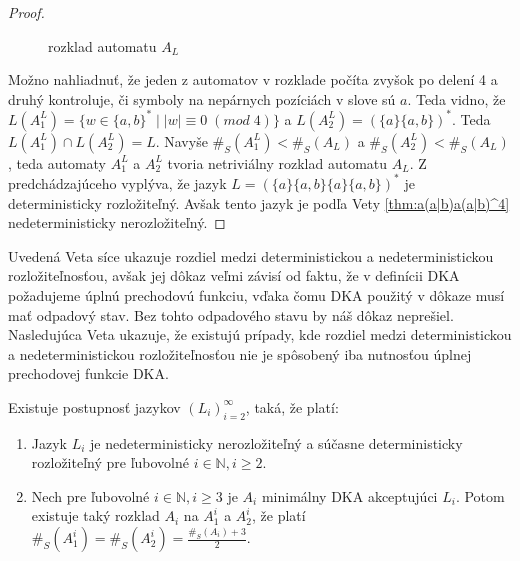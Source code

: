 \begin{proof}
\begin{figure}[H]
\caption{rozklad automatu $ A_L $}
\end{figure}

Možno nahliadnuť, že jeden z automatov v rozklade počíta zvyšok po delení 4 a druhý kontroluje, či symboly na nepárnych pozíciách v slove sú $ a $. Teda vidno, že $ L(A_1^L) = \lbrace w \in \lbrace a,b \rbrace^* \; | \; |w| \equiv 0 \; (mod \; 4) \rbrace $ a $ L(A_2^L) = (\lbrace a \rbrace \lbrace a,b \rbrace)^* $. Teda $ L(A_1^L) \cap L(A_2^L) = L $. Navyše $ \#_S(A_1^L) < \#_S(A_L) $ a $ \#_S(A_2^L) < \#_S(A_L) $, teda automaty $ A_1^L $ a $ A_2^L $ tvoria netriviálny rozklad automatu $ A_L $. Z predchádzajúceho vyplýva, že jazyk $ L = (\lbrace a \rbrace \lbrace a,b \rbrace \lbrace a \rbrace \lbrace a,b \rbrace)^* $ je deterministicky rozložiteľný. Avšak tento jazyk je podľa Vety \ref{thm:a(a|b)a(a|b)^4} nedeterministicky nerozložiteľný.
\end{proof}

Uvedená Veta síce ukazuje rozdiel medzi deterministickou a nedeterministickou rozložiteľnosťou, avšak jej dôkaz veľmi závisí od faktu, že v definícii DKA požadujeme úplnú prechodovú funkciu, vďaka čomu DKA použitý v dôkaze musí mať odpadový stav. Bez tohto odpadového stavu by náš dôkaz neprešiel. Nasledujúca Veta ukazuje, že existujú prípady, kde rozdiel medzi deterministickou a nedeterministickou rozložiteľnosťou nie je spôsobený iba nutnosťou úplnej prechodovej funkcie DKA.

\begin{theorem}
\label{thm:ndet_vs_det_diff_big}
Existuje postupnosť jazykov $ (L_i)_{i=2}^{\infty} $, taká, že platí:
\begin{enumerate}[label=(\alph*)]
\item \label{thm:ndet_vs_det_diff_big_item_1} Jazyk $ L_i $ je nedeterministicky nerozložiteľný a súčasne deterministicky rozložiteľný pre ľubovolné $ i \in \mathbb{N}, i \geq 2 $.
\item \label{thm:ndet_vs_det_diff_big_item_2} Nech pre ľubovolné $ i \in \mathbb{N}, i \geq 3 $ je $ A_i $ minimálny DKA akceptujúci $ L_i $. Potom existuje taký rozklad $ A_i $ na $ A_1^i $ a $ A_2^i $, že platí $ \#_S(A_1^i)=\#_S(A_2^i)=\frac{\#_S(A_i)+3}{2} $.
\end{enumerate}
\end{theorem}

